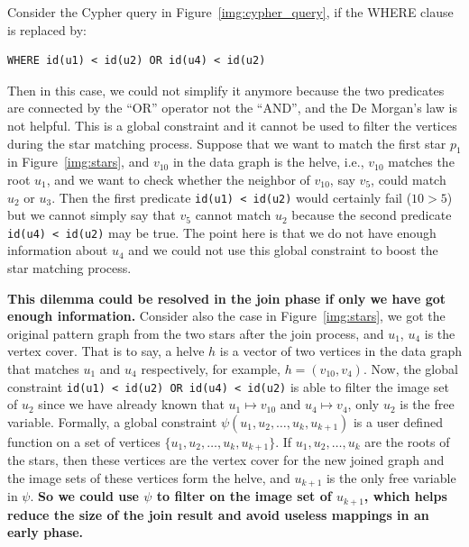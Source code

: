 Consider the Cypher query in Figure~\ref{img:cypher_query}, if the WHERE clause is replaced by:
\begin{verbatim}
WHERE id(u1) < id(u2) OR id(u4) < id(u2)
\end{verbatim}
Then in this case, we could not simplify it anymore because the two predicates are connected by the ``OR'' operator not the ``AND'', and the De Morgan's law is not helpful.
This is a global constraint and it cannot be used to filter the vertices during the star matching process.
Suppose that we want to match the first star $p_1$ in Figure~\ref{img:stars},
and $v_{10}$ in the data graph is the helve, i.e., $v_{10}$ matches the root $u_1$,
and we want to check whether the neighbor of $v_{10}$, say $v_{5}$, could match $u_2$ or $u_3$.
Then the first predicate \texttt{id(u1) < id(u2)} would certainly fail ($10 > 5$) but we cannot simply say that $v_5$ cannot match $u_2$ because the second predicate \texttt{id(u4) < id(u2)} may be true.
The point here is that we do not have enough information about $u_4$ and we could not use this global constraint to boost the star matching process.

\textbf{This dilemma could be resolved in the join phase if only we have got enough information.}
Consider also the case in Figure~\ref{img:stars}, we got the original pattern graph from the two stars after the join process, and $u_1$, $u_4$ is the vertex cover.
That is to say, a helve $h$ is a vector of two vertices in the data graph that matches $u_1$ and $u_4$ respectively,
for example, $h = (v_{10}, v_4)$.
Now, the global constraint \texttt{id(u1) < id(u2) OR id(u4) < id(u2)} is able to filter the image set of $u_2$ since we have already known that $u_1 \mapsto v_{10}$ and $u_4 \mapsto v_4$, only $u_2$ is the free variable.
Formally, a global constraint $\psi(u_1, u_2, \dots, u_k, u_{k+1})$ is a user defined function on a set of vertices $\{u_1, u_2, \dots, u_k, u_{k+1}\}$.
If $u_1, u_2, \dots, u_k$ are the roots of the stars, then these vertices are the vertex cover for the new joined graph and the image sets of these vertices form the helve, and $u_{k+1}$ is the only free variable in $\psi$.
\textbf{So we could use $\psi$ to filter on the image set of $u_{k+1}$,
which helps reduce the size of the join result and avoid useless mappings in an early phase.}


